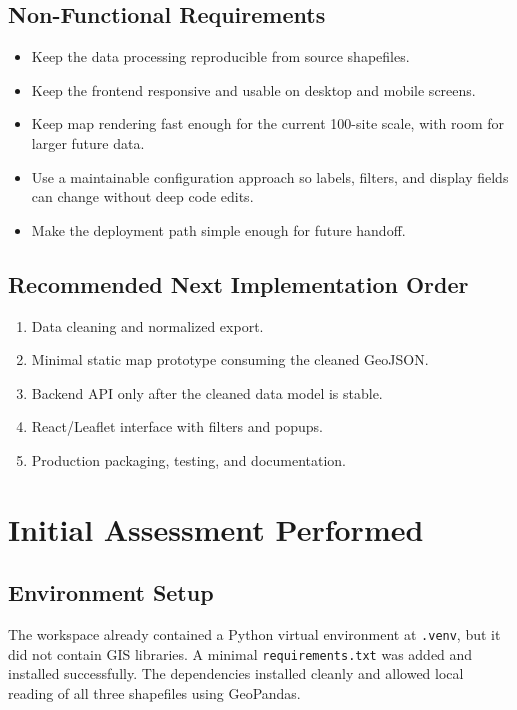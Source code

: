 \documentclass[11pt]{article}
\newcommand{\code}[1]{\nolinkurl{#1}}
\begin{document}
\subsection{Non-Functional Requirements}

\begin{itemize}
  \item Keep the data processing reproducible from source shapefiles.
  \item Keep the frontend responsive and usable on desktop and mobile screens.
  \item Keep map rendering fast enough for the current 100-site scale, with room for larger future data.
  \item Use a maintainable configuration approach so labels, filters, and display fields can change without deep code edits.
  \item Make the deployment path simple enough for future handoff.
\end{itemize}

\subsection{Recommended Next Implementation Order}

\begin{enumerate}
  \item Data cleaning and normalized export.
  \item Minimal static map prototype consuming the cleaned GeoJSON.
  \item Backend API only after the cleaned data model is stable.
  \item React/Leaflet interface with filters and popups.
  \item Production packaging, testing, and documentation.
\end{enumerate}

\section{Initial Assessment Performed}

\subsection{Environment Setup}

The workspace already contained a Python virtual environment at \code{.venv}, but it
did not contain GIS libraries. A minimal \code{requirements.txt} was added and installed
successfully. The dependencies installed cleanly and allowed local reading of all
three shapefiles using GeoPandas.
\end{document}
